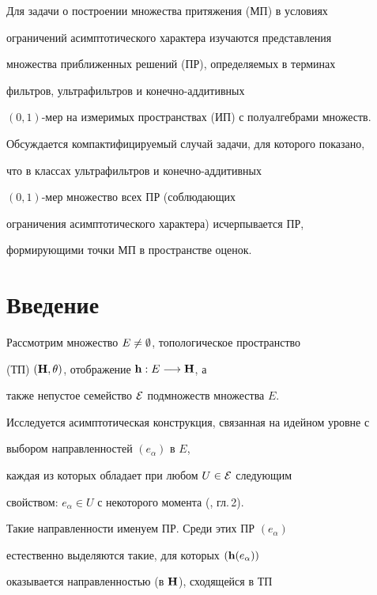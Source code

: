 \label{begin}








Для задачи о построении множества притяжения (МП) в условиях


ограничений асимптотического характера изучаются представления


множества приближенных решений (ПР), определяемых в терминах


фильтров, ультрафильтров и конечно-аддитивных 


$(0,1)$-мер на измеримых пространствах (ИП) с полуалгебрами множеств.


Обсуждается компактифицируемый случай задачи, для которого показано,


что в классах ультрафильтров и конечно-аддитивных


$(0,1)$-мер множество всех ПР (соблюдающих


ограничения асимптотического характера) исчерпывается ПР,


формирующими точки МП в пространстве оценок.








\section{Введение}


 


Рассмотрим множество $E \ne \emptyset$, топологическое пространство


(ТП) $({\bold H},\theta)$, отображение ${\bold h}: E \longrightarrow {\bold H}$, а


также непустое семейство ${\cal E}$ подмножеств множества $E$.


Исследуется асимптотическая конструкция, связанная на идейном уровне с


выбором направленностей $(e_\alpha)$ в $E$,


каждая из которых обладает при любом $U \in {\cal E}$ следующим


свойством: $e_\alpha \in U$ с некоторого момента (\cite{1}, гл.\,2).


Такие направленности именуем ПР. Среди этих ПР $(e_\alpha)$


естественно выделяются такие, для которых $({\bold h}(e_\alpha))$


оказывается направленностью (в ${\bold H}$), сходящейся в ТП 


